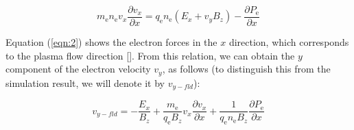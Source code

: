 \documentclass[draft,jgrga]{agutex2015}
\begin{document}
\begin{article}
\begin{linenomath}
 \begin{equation}
  m_\mathrm{e} n_\mathrm{e} v_x \frac{\partial v_x}{\partial x}
    = q_\mathrm{e} n_\mathrm{e} (E_x + v_y B_z) - 
\frac{\partial P_{\mathrm{e}}}{\partial x}
\label{eqn:2}
\end{equation}
\end{linenomath}
Equation (\ref{eqn:2}) shows the electron forces 
in the $x$ direction, which corresponds to the plasma flow direction 
[\cite{Moritaka2012}].
From this relation, we can obtain the $y$ component of the 
electron velocity $v_y$, as follows (to distinguish this from the simulation result, 
we will denote it by $v_{y-fld}$):


\begin{linenomath}
 \begin{equation}
  v_{y-fld} = 
   - \frac{E_x}{B_z} 
   + \frac {m_\mathrm{e}}{q_\mathrm{e} B_z}v_x\frac{\partial v_x}{\partial x}
   + \frac{1}{q_\mathrm{e} n_\mathrm{e} B_z}\frac{\partial P_{\mathrm{e}}}{\partial x}
 \label{eqn:3}
 \end{equation}
\end{linenomath}


\end{article}
\end{document}
